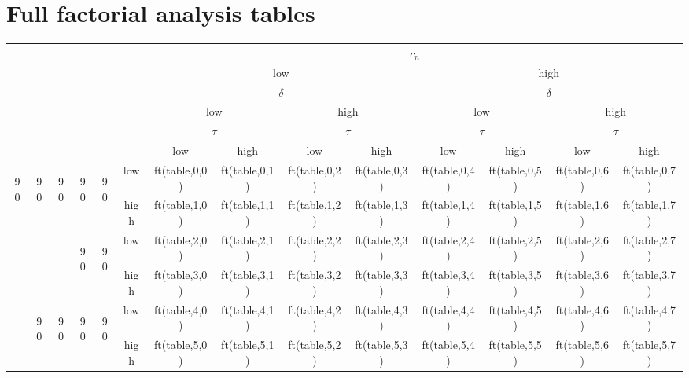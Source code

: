 \documentclass[a4paper,10pt]{article}
\newcommand\tabrotate[1]{\begin{turn}{90}\rlap{{'{#'}}1}\end{turn}}
\begin{document}
\section{Full factorial analysis tables}
{%
    \begin{table}[htp]
    \begin{center}
    \begin{small}
    \begin{tabular}{cccccccccccccc}
       &&&&&& \multicolumn{8}{c}{$c_n$} \\
    &&&&&& \multicolumn{4}{c}{low}&\multicolumn{4}{c}{high} \\
       \hline
    &&&&&& \multicolumn{4}{c}{$\delta$}&\multicolumn{4}{c}{$\delta$} \\
    &&&&&& \multicolumn{2}{c}{low}&\multicolumn{2}{c}{high}&\multicolumn{2}{c}{low}&\multicolumn{2}{c}{high} \\
       \hline
    &&&&&& \multicolumn{2}{c}{$\tau$}&\multicolumn{2}{c}{$\tau$}&\multicolumn{2}{c}{$\tau$}&\multicolumn{2}{c}{$\tau$}\\
    &&&&&&low&high&low&high&low&high&low&high\\
       \hline
      \multirow{8}{*}{\tabrotate{s}} &\multirow{4}{*}{\tabrotate{low}} &\multirow{4}{*}{\tabrotate{$c_r$}}&\multirow{2}{*}{\tabrotate{low}}&\multirow{2}{*}{\tabrotate{a}}&low&{{ft(table,0,0)}}&{{ft(table,0,1)}}&{{ft(table,0,2)}}&{{ft(table,0,3)}}&{{ft(table,0,4)}}&{{ft(table,0,5)}}&{{ft(table,0,6)}}&{{ft(table,0,7)}}\\
      & &&&&high&{{ft(table,1,0)}}&{{ft(table,1,1)}}&{{ft(table,1,2)}}&{{ft(table,1,3)}}&{{ft(table,1,4)}}&{{ft(table,1,5)}}&{{ft(table,1,6)}}&{{ft(table,1,7)}}\\
    &&&\multirow{2}{*}{\tabrotate{high}}&\multirow{2}{*}{\tabrotate{a}}&low&{{ft(table,2,0)}}&{{ft(table,2,1)}}&{{ft(table,2,2)}}&{{ft(table,2,3)}}&{{ft(table,2,4)}}&{{ft(table,2,5)}}&{{ft(table,2,6)}}&{{ft(table,2,7)}}\\
    &&&&&high&{{ft(table,3,0)}}&{{ft(table,3,1)}}&{{ft(table,3,2)}}&{{ft(table,3,3)}}&{{ft(table,3,4)}}&{{ft(table,3,5)}}&{{ft(table,3,6)}}&{{ft(table,3,7)}}\\
    &\multirow{4}{*}{\tabrotate{high}}&\multirow{4}{*}{\tabrotate{$c_r$}}&\multirow{2}{*}{\tabrotate{low}}&\multirow{2}{*}{\tabrotate{a}}&low&{{ft(table,4,0)}}&{{ft(table,4,1)}}&{{ft(table,4,2)}}&{{ft(table,4,3)}}&{{ft(table,4,4)}}&{{ft(table,4,5)}}&{{ft(table,4,6)}}&{{ft(table,4,7)}}\\
    &&&&&high&{{ft(table,5,0)}}&{{ft(table,5,1)}}&{{ft(table,5,2)}}&{{ft(table,5,3)}}&{{ft(table,5,4)}}&{{ft(table,5,5)}}&{{ft(table,5,6)}}&{{ft(table,5,7)}}\\

\end{tabular}
\end{small}
\end{center}
\end{table}}
\end{document}
